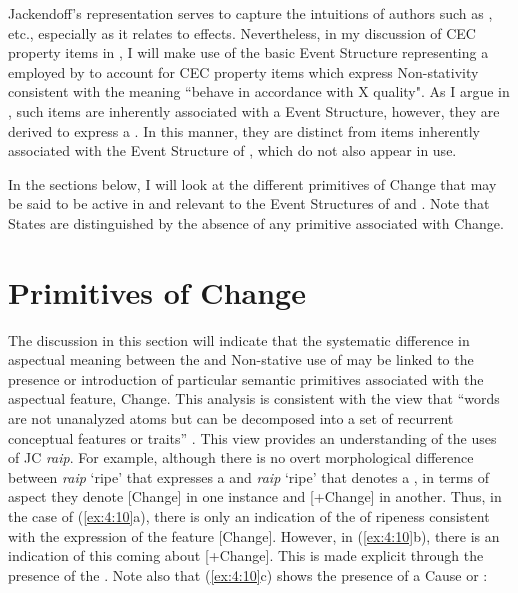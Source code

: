Jackendoff’s representation serves to capture the intuitions of
authors such as \citet{Pustejovsky1991,Krifka1998},
\citet{Tenny1994,Verkuyl1993} etc., especially as it relates
to  effects.  Nevertheless, in my discussion of CEC property
items in , I will make use of the basic Event Structure
representing a  employed by \citet{Pustejovsky1991} to account
for CEC property items which express Non-stativity consistent with the
meaning ``behave in accordance with X quality".  As I argue in
, such items are inherently associated with a 
Event Structure, however, they are derived to express a .  In
this manner, they are distinct from items inherently associated with
the Event Structure of , which do not also appear in 
use.

In the sections below, I will look at the different primitives of
Change that may be said to be active in and relevant to the Event
Structures of  and .  Note that States are
distinguished by the absence of any primitive associated with Change.

\section{Primitives of Change}\label{sec:4.3}

The discussion in this section will indicate that the systematic
difference in aspectual meaning between the  and Non-stative
use of  may be linked to the presence or
introduction of particular semantic primitives associated with the
aspectual feature, Change.  This analysis is consistent with the view
that ``words are not unanalyzed atoms but can be decomposed into a set
of recurrent conceptual features or traits” \citep[350]{ChierchiaMcConnell-Ginet1992}.  
This view provides an understanding of the uses of JC \textit{raip}.  
For example, although there is no overt morphological difference between \textit{raip}
`ripe' that expresses a  and \textit{raip} `ripe' that denotes a
, in terms of aspect they denote [\textminus Change] in one instance and
[+Change] in another.  Thus, in the case of (\ref{ex:4:10}a), there is
only an indication of the  of ripeness consistent with the
expression of the feature [\textminus Change].  However, in (\ref{ex:4:10}b),
there is an indication of this  coming about [+Change].  This is
made explicit through the presence of the  .
Note also that (\ref{ex:4:10}c) shows the presence of a Cause or
:

